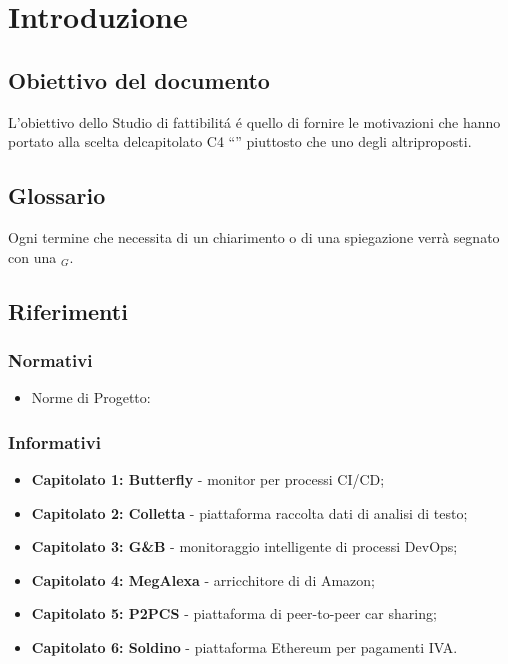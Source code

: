 \chapter{Introduzione}
\section{Obiettivo del documento}
L’obiettivo dello Studio di fattibilit\'a \'e quello di fornire le motivazioni che hanno portato alla scelta delcapitolato C4 “” piuttosto che uno degli altriproposti.
\section{Glossario} 
Ogni termine che necessita di un chiarimento o di una spiegazione verrà segnato con una $_{G}$.
\section{Riferimenti}
\subsection{Normativi}
\begin{itemize}
	\item Norme di Progetto: %
\end{itemize}
\subsection{Informativi}
\begin{itemize}
\item \textbf{Capitolato 1: Butterfly} - monitor per processi CI/CD;
\item \textbf{Capitolato 2: Colletta} - piattaforma raccolta dati di analisi di testo;
\item \textbf{Capitolato 3: G\&B} - monitoraggio intelligente di processi DevOps;
\item \textbf{Capitolato 4: MegAlexa} - arricchitore di di Amazon;
\item \textbf{Capitolato 5: P2PCS} - piattaforma di peer-to-peer car sharing;
\item \textbf{Capitolato 6: Soldino} - piattaforma Ethereum per pagamenti IVA.

\end{itemize}
